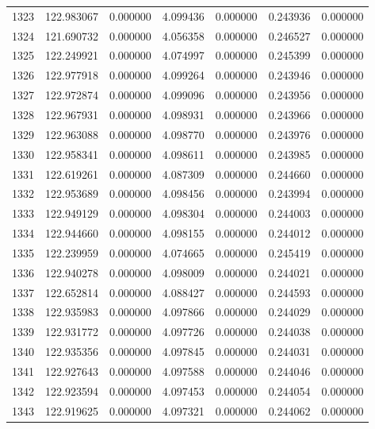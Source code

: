 \begin{tabular}{rrrrrrr}
1323 & 122.983067 &    0.000000 &  4.099436 &   0.000000 &   0.243936 &  0.000000 \\
1324 & 121.690732 &    0.000000 &  4.056358 &   0.000000 &   0.246527 &  0.000000 \\
1325 & 122.249921 &    0.000000 &  4.074997 &   0.000000 &   0.245399 &  0.000000 \\
1326 & 122.977918 &    0.000000 &  4.099264 &   0.000000 &   0.243946 &  0.000000 \\
1327 & 122.972874 &    0.000000 &  4.099096 &   0.000000 &   0.243956 &  0.000000 \\
1328 & 122.967931 &    0.000000 &  4.098931 &   0.000000 &   0.243966 &  0.000000 \\
1329 & 122.963088 &    0.000000 &  4.098770 &   0.000000 &   0.243976 &  0.000000 \\
1330 & 122.958341 &    0.000000 &  4.098611 &   0.000000 &   0.243985 &  0.000000 \\
1331 & 122.619261 &    0.000000 &  4.087309 &   0.000000 &   0.244660 &  0.000000 \\
1332 & 122.953689 &    0.000000 &  4.098456 &   0.000000 &   0.243994 &  0.000000 \\
1333 & 122.949129 &    0.000000 &  4.098304 &   0.000000 &   0.244003 &  0.000000 \\
1334 & 122.944660 &    0.000000 &  4.098155 &   0.000000 &   0.244012 &  0.000000 \\
1335 & 122.239959 &    0.000000 &  4.074665 &   0.000000 &   0.245419 &  0.000000 \\
1336 & 122.940278 &    0.000000 &  4.098009 &   0.000000 &   0.244021 &  0.000000 \\
1337 & 122.652814 &    0.000000 &  4.088427 &   0.000000 &   0.244593 &  0.000000 \\
1338 & 122.935983 &    0.000000 &  4.097866 &   0.000000 &   0.244029 &  0.000000 \\
1339 & 122.931772 &    0.000000 &  4.097726 &   0.000000 &   0.244038 &  0.000000 \\
1340 & 122.935356 &    0.000000 &  4.097845 &   0.000000 &   0.244031 &  0.000000 \\
1341 & 122.927643 &    0.000000 &  4.097588 &   0.000000 &   0.244046 &  0.000000 \\
1342 & 122.923594 &    0.000000 &  4.097453 &   0.000000 &   0.244054 &  0.000000 \\
1343 & 122.919625 &    0.000000 &  4.097321 &   0.000000 &   0.244062 &  0.000000 \\

\end{tabular}
